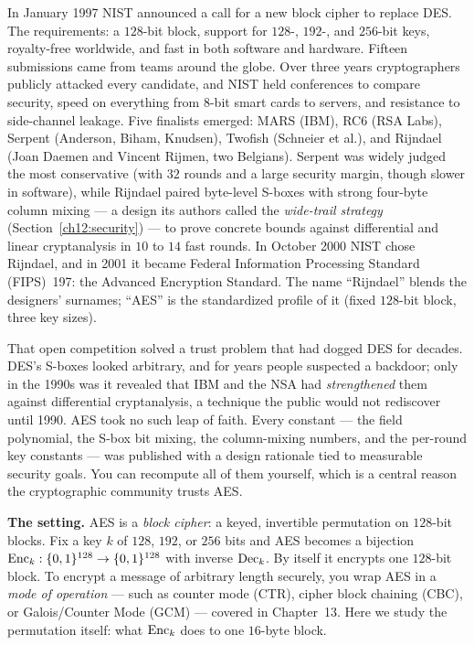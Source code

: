 \begin{historybox}
In January 1997 NIST announced a call for a new block cipher to replace DES. The requirements: a $128$-bit block, support for $128$-, $192$-, and $256$-bit keys, royalty-free worldwide, and fast in both software and hardware. Fifteen submissions came from teams around the globe. Over three years cryptographers publicly attacked every candidate, and NIST held conferences to compare security, speed on everything from $8$-bit smart cards to servers, and resistance to side-channel leakage. Five finalists emerged: MARS (IBM), RC6 (RSA Labs), Serpent (Anderson, Biham, Knudsen), Twofish (Schneier et al.), and Rijndael (Joan Daemen and Vincent Rijmen, two Belgians). Serpent was widely judged the most conservative (with $32$ rounds and a large security margin, though slower in software), while Rijndael paired byte-level S-boxes with strong four-byte column mixing --- a design its authors called the \emph{wide-trail strategy} (Section~\ref{ch12:security}) --- to prove concrete bounds against differential and linear cryptanalysis in $10$ to $14$ fast rounds. In October 2000 NIST chose Rijndael, and in 2001 it became Federal Information Processing Standard (FIPS)~197: the Advanced Encryption Standard. The name ``Rijndael'' blends the designers' surnames; ``AES'' is the standardized profile of it (fixed $128$-bit block, three key sizes).
\end{historybox}

That open competition solved a trust problem that had dogged DES for decades.
DES's S-boxes looked arbitrary, and for years people suspected a backdoor; only
in the 1990s was it revealed that IBM and the NSA had \emph{strengthened} them
against differential cryptanalysis, a technique the public would not rediscover
until 1990. AES took no such leap of faith. Every constant --- the field
polynomial, the S-box bit mixing, the column-mixing numbers, and the per-round
key constants --- was published with a design rationale tied to measurable
security goals. You can recompute all of them yourself, which is a central
reason the cryptographic community trusts AES.

\begin{focusbox}
\textbf{The setting.} AES is a \emph{block cipher}: a keyed, invertible
permutation on $128$-bit blocks. Fix a key $k$ of $128$, $192$, or $256$ bits and
AES becomes a bijection $\operatorname{Enc}_k : \{0,1\}^{128} \to \{0,1\}^{128}$ with inverse
$\operatorname{Dec}_k$. By itself it encrypts one $128$-bit block. To encrypt a message
of arbitrary length securely, you wrap AES in a \emph{mode of operation} --- such
as counter mode (CTR), cipher block chaining (CBC), or Galois/Counter Mode (GCM)
--- covered in Chapter~13. Here we study the permutation itself: what $\operatorname{Enc}_k$
does to one $16$-byte block.
\end{focusbox}

